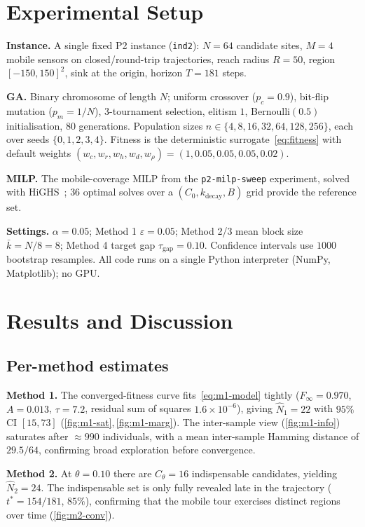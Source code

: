 \documentclass[conference]{IEEEtran}
\newcommand{\Nhat}{\hat{N}}
\begin{document}
\section{Experimental Setup}
\label{sec:setup}
\textbf{Instance.} A single fixed P2 instance (\texttt{ind2}): $N=64$ candidate
sites, $M=4$ mobile sensors on closed/round-trip trajectories, reach radius
$R=50$, region $[-150,150]^2$, sink at the origin, horizon $T=181$ steps.

\textbf{GA.} Binary chromosome of length $N$; uniform crossover ($p_c=0.9$),
bit-flip mutation ($p_m=1/N$), $3$-tournament selection, elitism $1$,
Bernoulli$(0.5)$ initialisation, $80$ generations. Population sizes
$n\in\{4,8,16,32,64,128,256\}$, each over seeds $\{0,1,2,3,4\}$. Fitness is the
deterministic surrogate~\eqref{eq:fitness} with default weights
$(w_c,w_r,w_h,w_d,w_\rho)=(1,0.05,0.05,0.05,0.02)$.

\textbf{MILP.} The mobile-coverage MILP from the \texttt{p2-milp-sweep}
experiment, solved with HiGHS~\cite{huangfu2018highs}; $36$ optimal solves over a
$(C_0,k_{\mathrm{decay}},B)$ grid provide the reference set.

\textbf{Settings.} $\alpha=0.05$; Method 1 $\varepsilon=0.05$; Method 2/3 mean
block size $\bar k = N/8 = 8$; Method 4 target gap $\tau_{\mathrm{gap}}=0.10$.
Confidence intervals use $1000$ bootstrap resamples. All code runs on a single
Python interpreter (NumPy, Matplotlib); no GPU.

\section{Results and Discussion}
\label{sec:results}
\subsection{Per-method estimates}
\textbf{Method 1.} The converged-fitness curve fits~\eqref{eq:m1-model} tightly
($F_\infty=0.970$, $A=0.013$, $\tau=7.2$, residual sum of squares
$1.6\times10^{-6}$), giving $\Nhat_1=22$ with $95\%$ CI $[15,73]$
(\autoref{fig:m1-sat},\,\autoref{fig:m1-marg}). The inter-sample view
(\autoref{fig:m1-info}) saturates after $\approx 990$ individuals, with a mean
inter-sample Hamming distance of $29.5/64$, confirming broad exploration before
convergence.

\textbf{Method 2.} At $\theta=0.10$ there are $C_\theta=16$ indispensable
candidates, yielding $\Nhat_2=24$. The indispensable set is only fully revealed
late in the trajectory ($t^*=154/181$, $85\%$), confirming that the mobile tour
exercises distinct regions over time (\autoref{fig:m2-conv}).
\end{document}
